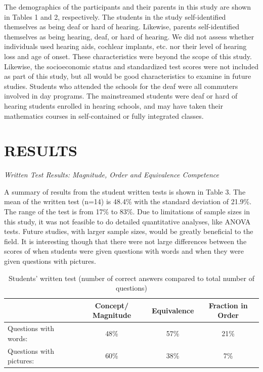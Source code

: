 \documentclass[11.5pt]{sig-alternate} %
\begin{document}
\begin{large}
The demographics of the participants and their parents in this study are shown in Tables 1 and 2, respectively. The students in the study self-identified themselves as being deaf or hard of hearing. Likewise, parents self-identified themselves as being hearing, deaf, or hard of hearing. We did not assess whether individuals used hearing aids, cochlear implants, etc. nor their level of hearing loss and age of onset. These characteristics were beyond the scope of this study. Likewise, the socioeconomic status and standardized test scores were not included as part of this study, but all would be good characteristics to examine in future studies. Students who attended the schools for the deaf were all commuters involved in day programs. The mainstreamed students were deaf or hard of hearing students enrolled in hearing schools, and may have taken their mathematics courses in self-contained or fully integrated classes.

\section*{RESULTS}

\textit{Written Test Results: Magnitude, Order and Equivalence Competence}

A summary of results from the student written tests is shown in Table 3. The mean of the written test (n=14) is 48.4\% with the standard deviation of 21.9\%. The range of the test is from 17\% to 83\%. Due to limitations of sample sizes in this study, it was not feasible to do detailed quantitative analyses, like ANOVA tests. Future studies, with larger sample sizes, would be greatly beneficial to the field. It is interesting though that there were not large differences between the scores of when students were given questions with words and when they were given questions with pictures.

\begin{table}[ht]
\caption{Students’ written test (number of correct answers compared to total number of questions)}
\begin{tabular}{|l|c|c|c|}
\hline
 & Concept/ Magnitude & Equivalence & Fraction in Order \\ \hline
Questions with words: & 48\% & 57\% & 21\% \\ \hline
Questions with pictures: & 60\% & 38\% & 7\% \\ \hline
\end{tabular}
\end{table}


\end{large}
\end{document}
